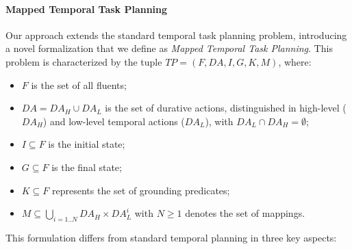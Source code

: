 
\paragraph{Mapped Temporal Task Planning}
\noindent Our approach extends the standard temporal task planning problem, introducing a novel formalization that we define as \textit{Mapped Temporal Task Planning}. This problem is characterized by the tuple $TP=(F, DA, I, G, K, M)$, where:
\begin{itemize}
    \item $F$ is the set of all fluents;
    \item $DA = DA_H \cup DA_L$ is the set of durative actions, distinguished in high-level ($DA_H$) and low-level temporal actions ($DA_L$), with $DA_L \cap DA_H = \emptyset$;
    \item $I\subseteq F$ is the initial state;
    \item $G\subseteq F$ is the final state;
    \item $K\subseteq F$ represents the set of grounding predicates;
    \item $\displaystyle M \subseteq \bigcup_{i=1..N} DA_H \times DA_L^i$ with $N \ge 1$ denotes the set of mappings.
\end{itemize}

This formulation differs from standard temporal planning in three key aspects:

